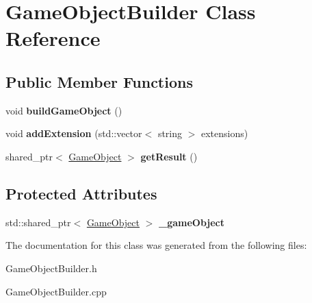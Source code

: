 \hypertarget{class_game_object_builder}{}\section{Game\+Object\+Builder Class Reference}
\label{class_game_object_builder}
\subsection*{Public Member Functions}
\begin{DoxyCompactItemize}
\item 
\mbox{\label{class_game_object_builder_aa6b134262f25c9210696ecc0be4d64b6}} 
void {\bfseries build\+Game\+Object} ()
\item 
\mbox{\label{class_game_object_builder_a86adfd2a3ac5d8fb98e9ab78caabbb87}} 
void {\bfseries add\+Extension} (std\+::vector$<$ string $>$ extensions)
\item 
\mbox{\label{class_game_object_builder_a7b8c868cad563c4afdf4ede8461438b6}} 
shared\+\_\+ptr$<$ \mbox{\hyperlink{class_game_object}{Game\+Object}} $>$ {\bfseries get\+Result} ()
\end{DoxyCompactItemize}
\subsection*{Protected Attributes}
\begin{DoxyCompactItemize}
\item 
\mbox{\label{class_game_object_builder_ac77339c64c7851f4134184298bcaf13d}} 
std\+::shared\+\_\+ptr$<$ \mbox{\hyperlink{class_game_object}{Game\+Object}} $>$ {\bfseries \+\_\+game\+Object}
\end{DoxyCompactItemize}


The documentation for this class was generated from the following files\+:\begin{DoxyCompactItemize}
\item 
Game\+Object\+Builder.\+h\item 
Game\+Object\+Builder.\+cpp\end{DoxyCompactItemize}
